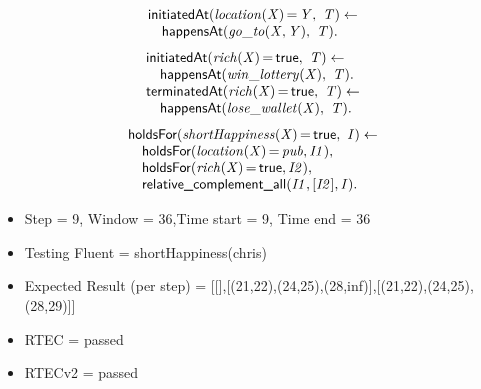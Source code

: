 \documentclass[8pt]{beamer}
\DeclareMathOperator{\val}{=}  %
\def \patsize {}
\def\happensAt{\textsf{\patsize happensAt}}
\def\holdsFor{\textsf{\patsize holdsFor}}
\def\initiatedAt{\textsf{\patsize initiatedAt}}
\def\terminatedAt{\textsf{\patsize terminatedAt}}
\def\complementall{\textsf{\patsize relative\_complement\_all}}
\def\true{\textsf{\patsize true}}
\newenvironment{mysplit}%
  {\arraycolsep 0pt \begin{array}{l}}%
  {\end{array}}
\begin{document}
\begin{frame}
\begin{minipage}{0.48\linewidth}
        \begin{align*}
            \begin{mysplit}
                \initiatedAt\mathit{(location(X)\val Y,\ T) \leftarrow}\\
                \quad    \happensAt\mathit{(go\_to(X,Y),\ T).}
            \end{mysplit}
        \end{align*}
        \begin{align*}
            \begin{mysplit}
                \initiatedAt\mathit{(rich(X)\val\true,\ T) \leftarrow}\\
                \quad    \happensAt\mathit{(win\_lottery(X),\ T).}\\
                \terminatedAt\mathit{(rich(X)\val\true,\ T) \leftarrow}\\
                \quad    \happensAt\mathit{(lose\_wallet(X),\ T)}.\\
            \end{mysplit}
        \end{align*}
        \begin{align*}
            \begin{mysplit}
                \holdsFor\mathit{(shortHappiness(X)\val\true,\ I) \leftarrow}\\
                \quad    \holdsFor\mathit{(location(X)\val pub,I1)},\\
                \quad    \holdsFor\mathit{(rich(X)\val\true,I2)},\\
                \quad    \complementall\mathit{(I1,[I2],I)}.\\
            \end{mysplit}
        \end{align*}
    \end{minipage}

    \begin{itemize}
        \item Step = 9, Window = 36,Time start = 9, Time end = 36
        \item Testing Fluent = shortHappiness(chris) 
        \item Expected Result (per step) = [[],[(21,22),(24,25),(28,inf)],[(21,22),(24,25),(28,29)]]
        \item RTEC = passed
        \item RTECv2 = passed
    \end{itemize}
\end{frame}
\end{document}
